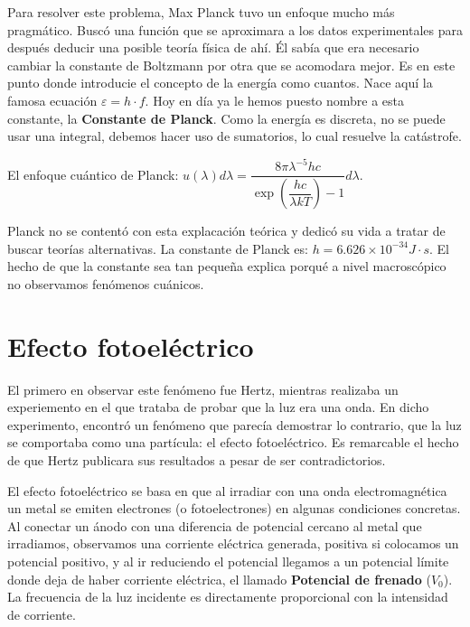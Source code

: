 \documentclass{report}
\begin{document}
    \vspace{0.4cm} \noindent Para resolver este problema, Max Planck tuvo un enfoque mucho más pragmático. Buscó una función que se aproximara a los datos experimentales para después deducir
    una posible teoría física de ahí. Él sabía que era necesario cambiar la constante de Boltzmann por otra que se acomodara mejor. Es en este punto donde introducie
    el concepto de la energía como cuantos. Nace aquí la famosa ecuación $\varepsilon = h\cdot f$. Hoy en día ya le hemos puesto nombre a esta constante, la 
    \textbf{Constante de Planck}. Como la energía es discreta, no se puede usar una integral, debemos hacer uso de sumatorios, lo cual resuelve la catástrofe.

    \vspace{0.4cm} \noindent El enfoque cuántico de Planck: $u(\lambda)d\lambda=\dfrac{8\pi\lambda^{-5}hc}{\exp\left(\dfrac{hc}{\lambda k T}\right)-1}d\lambda$. 
    
    \vspace{0.1cm}\noindent Planck no se contentó con esta explacación teórica y dedicó su vida a tratar de buscar teorías alternativas.
    La constante de Planck es: $h=6.626\times10^{-34}J\cdot s$. El hecho de que la constante sea tan pequeña explica porqué a nivel 
    macroscópico no observamos fenómenos cuánicos.
  \section{Efecto fotoeléctrico}
    \noindent El primero en observar este fenómeno fue Hertz, mientras realizaba un experiemento en el que trataba de probar que la luz era una onda. En dicho experimento,
    encontró un fenómeno que parecía demostrar lo contrario, que la luz se comportaba como una partícula: el efecto fotoeléctrico. Es remarcable el hecho de que Hertz
    publicara sus resultados a pesar de ser contradictorios.

    \vspace{0.4cm} \noindent El efecto fotoeléctrico se basa en que al irradiar con una onda electromagnética un metal se emiten electrones (o fotoelectrones) en algunas condiciones concretas.
    Al conectar un ánodo con una diferencia de potencial cercano al metal que irradiamos, observamos una corriente eléctrica generada, positiva si colocamos un 
    potencial positivo, y al ir reduciendo el potencial llegamos a un potencial límite donde deja de haber corriente eléctrica, el llamado \textbf{Potencial de
    frenado} ($V_0$). La frecuencia de la luz incidente es directamente proporcional con la intensidad de corriente. 
    
\end{document}
